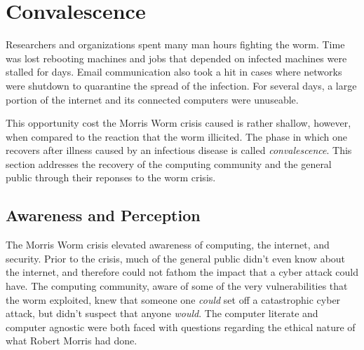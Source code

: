 \section*{Convalescence}

Researchers and
organizations spent many man hours fighting the worm. Time was lost rebooting
machines and jobs that depended on infected machines were stalled for days.
Email communication also took a hit in cases where networks were shutdown to
quarantine the spread of the infection\cite{seeley_tour_1989}. For several days,
a large portion of the internet and its connected computers were unuseable.

This opportunity cost the Morris Worm crisis caused is rather shallow, however,
when compared to the reaction that the worm illicited. The phase in which one
recovers after illness caused by an infectious disease is called \textit{convalescence}. This
section addresses the recovery of the computing community and the
general public through their reponses to the worm crisis.

\subsection*{Awareness and Perception}
The Morris Worm crisis elevated awareness of computing, the internet, and
security. Prior to the crisis, much of the general public didn't even
know about the internet, and therefore could not fathom the impact that a
cyber attack could have. The computing community, aware of some of the very
vulnerabilities that the worm exploited, knew that someone one \textit{could}
set off a catastrophic cyber attack, but didn't suspect that anyone
\textit{would}. The computer literate and computer agnostic were both faced
with questions regarding the ethical nature of what Robert Morris had done.

